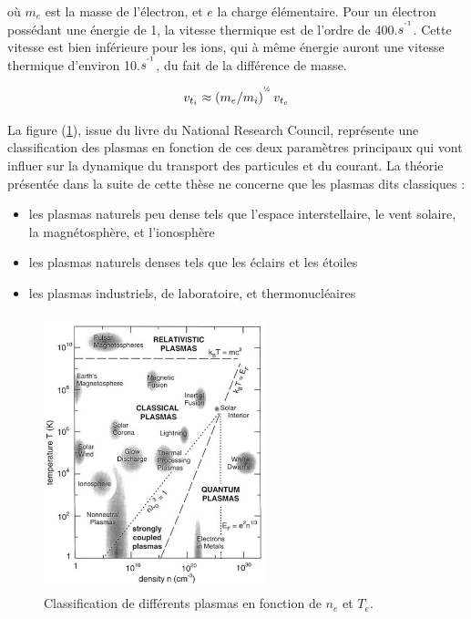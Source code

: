 où $m_e$ est la masse de l'électron, et $e$ la charge élémentaire. Pour un électron possédant
une énergie de \unit{1}{\electronvolt}, la vitesse thermique est de l'ordre de \unit{400}{\kilo\meter}.$s^{\operatorname{^{-1}}}$. 
Cette vitesse est bien inférieure pour les ions, qui à même énergie 
auront une vitesse thermique d'environ \unit{10}{\kilo\meter}.$s^{\operatorname{^{-1}}}$, du fait de la différence de masse.

\begin{equation}
	v_{t_i}\approx\left(m_e/m_i\right)^{^\text{\textonehalf}}v_{t_e}
\end{equation}

La figure (\ref{zoologie}), issue du livre du National Research
Council\cite{national1995Plasma}, représente une classification des plasmas en
fonction de ces deux paramètres principaux qui vont influer sur la dynamique du
transport des particules et du courant.
La théorie présentée dans la suite de cette thèse ne concerne que les plasmas
dits classiques :

\begin{itemize}
  \item les plasmas naturels peu dense tels que l'espace interstellaire,
  le vent solaire, la magnétosphère, et l'ionosphère
  \item les plasmas naturels denses tels que les éclairs et les étoiles
  \item les plasmas industriels, de laboratoire, et thermonucléaires
\end{itemize}
\begin{figure}[htbp]
\centering
\includegraphics[height=80mm,width=64mm]{figures/zoologie.png}{\caption{Classification
de différents plasmas en fonction de $n_e$ et $T_e$.}\label{zoologie}}
\end{figure}

